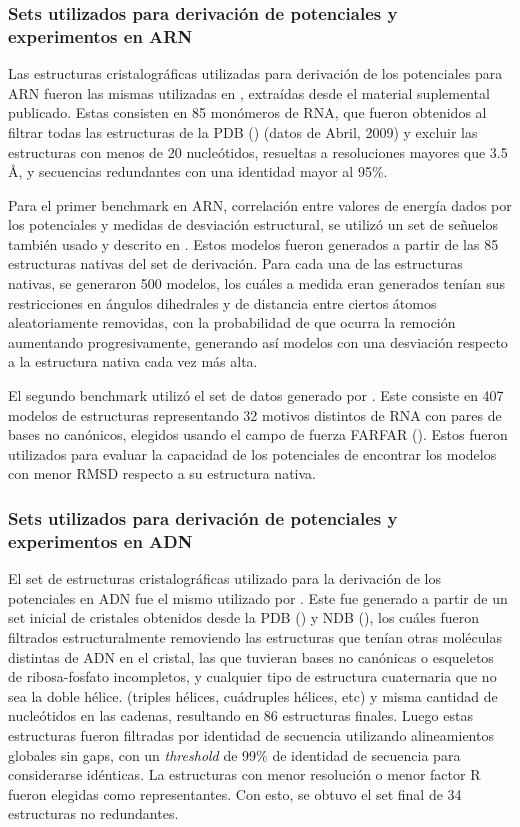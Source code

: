 \subsubsection{Sets utilizados para derivación de potenciales y experimentos en ARN}
\par
Las estructuras cristalográficas utilizadas para derivación de los potenciales para ARN fueron las mismas utilizadas en \cite{Capriotti2011}, extraídas desde el material suplemental publicado.
Estas consisten en 85 monómeros de RNA, que fueron obtenidos al filtrar todas las estructuras de la PDB (\cite{Berman2000}) (datos de Abril, 2009) y excluir las estructuras con menos de 20 nucleótidos, resueltas a resoluciones mayores que 3.5 \si{\angstrom}, y secuencias redundantes con una identidad mayor al 95\%.
\par
Para el primer benchmark en ARN, correlación entre valores de energía dados por los potenciales y medidas de desviación estructural, se utilizó un set de señuelos también usado y descrito en \cite{Capriotti2011}.
Estos modelos fueron generados a partir de las 85 estructuras nativas del set de derivación. 
Para cada una de las estructuras nativas, se generaron 500 modelos, los cuáles a medida eran generados tenían sus restricciones en ángulos dihedrales y de distancia entre ciertos átomos aleatoriamente removidas, con la probabilidad de que ocurra la remoción aumentando progresivamente, generando así modelos con una desviación respecto a la estructura nativa cada vez más alta.
\par
El segundo benchmark utilizó el set de datos generado por \cite{Das2010}. 
Este consiste en 407 modelos de estructuras representando 32 motivos distintos de RNA con pares de bases no canónicos, elegidos usando el campo de fuerza FARFAR (\cite{Das2010}). 
Estos fueron utilizados para evaluar la capacidad de los potenciales de encontrar los modelos con menor RMSD respecto a su estructura nativa.
\subsubsection{Sets utilizados para derivación de potenciales y experimentos en ADN}
\par
El set de estructuras cristalográficas utilizado para la derivación de los potenciales en ADN fue el mismo utilizado por \cite{Ibarra2013}.
Este fue generado a partir de un set inicial de cristales obtenidos desde la PDB (\cite{Berman2000}) y NDB (\cite{Berman1996}), los cuáles fueron filtrados estructuralmente removiendo las estructuras que tenían otras moléculas distintas de ADN en el cristal, las que tuvieran bases no canónicas o esqueletos de ribosa-fosfato incompletos, y cualquier tipo de estructura cuaternaria que no sea la doble hélice. (triples hélices, cuádruples hélices, etc) y misma cantidad de nucleótidos en las cadenas, resultando en 86 estructuras finales.
Luego estas estructuras fueron filtradas por identidad de secuencia utilizando alineamientos globales sin gaps, con un \textit{threshold} de 99\% de identidad de secuencia para considerarse idénticas. La estructuras con menor resolución o menor factor R fueron elegidas como representantes. Con esto, se obtuvo el set final de 34 estructuras no redundantes.
